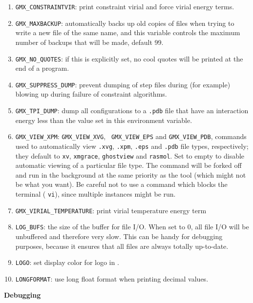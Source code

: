 \begin{enumerate}

\item   {\tt GMX_CONSTRAINTVIR}: print constraint virial and force virial energy terms.
\item   {\tt GMX_MAXBACKUP}: {\gromacs} automatically backs up old
        copies of files when trying to write a new file of the same
        name, and this variable controls the maximum number of
        backups that will be made, default 99.
\item   {\tt GMX_NO_QUOTES}: if this is explicitly set, no cool quotes
        will be printed at the end of a program.
\item   {\tt GMX_SUPPRESS_DUMP}: prevent dumping of step files during
        (for example) blowing up during failure of constraint
        algorithms.
\item   {\tt GMX_TPI_DUMP}: dump all configurations to a {\tt .pdb}
        file that have an interaction energy less than the value set
        in this environment variable.
\item   {\tt GMX_VIEW_XPM}: {\tt GMX_VIEW_XVG}, {\tt
        GMX_VIEW_EPS} and {\tt GMX_VIEW_PDB}, commands used to
        automatically view \@ {\tt .xvg}, {\tt .xpm}, {\tt .eps}
        and {\tt .pdb} file types, respectively; they default to {\tt xv}, {\tt xmgrace},
        {\tt ghostview} and {\tt rasmol}. Set to empty to disable
        automatic viewing of a particular file type. The command will
        be forked off and run in the background at the same priority
        as the {\gromacs} tool (which might not be what you want).
        Be careful not to use a command which blocks the terminal
        ({\eg} {\tt vi}), since multiple instances might be run.
\item   {\tt GMX_VIRIAL_TEMPERATURE}: print virial temperature energy term
\item   {\tt LOG_BUFS}: the size of the buffer for file I/O. When set
        to 0, all file I/O will be unbuffered and therefore very slow.
        This can be handy for debugging purposes, because it ensures
        that all files are always totally up-to-date.
\item   {\tt LOGO}: set display color for logo in {\tt {}}.
\item   {\tt LONGFORMAT}: use long float format when printing
        decimal values.

\end{enumerate}


{\bf Debugging}

